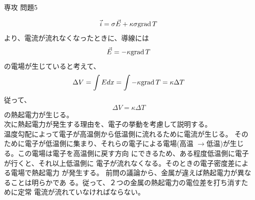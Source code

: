 \documentclass[fleqn]{jbook}
\begin{document}
\begin{answer}{専攻 問題5}{}
\begin{subanswers}
\SubAnswer
\begin{subsubanswers}

\SubSubAnswer
 
\[
\vec{i}=\sigma \vec{E}+\kappa\sigma {\rm grad\,}T
\]
より、電流が流れなくなったときに、導線には
\[
\vec{E}=-\kappa {\rm grad\,}T
\]
の電場が生じていると考えて、
\[
 \Delta V=\int Edx=\int -\kappa {\rm grad\,}T=\kappa\Delta T
\]
従って、
\[
 \Delta V=\kappa \Delta T
\]
 の熱起電力が生じる。\\
 次に熱起電力が発生する理由を、電子の挙動を考慮して説明する。\\
 温度勾配によって電子が高温側から低温側に流れるために電流が生じる。
 そのために電子が低温側に集まり、それらの電子による電場(高温
 $\rightarrow$低温)が生じる。この電場は電子を高温側に戻す方向
 にできるため、ある程度低温側に電子が行くと、それ以上低温側に
 電子が流れなくなる。そのときの電子密度差による電場で熱起電力
 が発生する。
\SubSubAnswer
 前問の議論から、金属が違えば熱起電力が異なることは明らかであ
 る。従って、２つの金属の熱起電力の電位差を打ち消すために定常
 電流が流れていなければならない。
\end{subsubanswers}
\SubAnswer

\begin{subsubanswers}
\SubSubAnswer


\end{subsubanswers}
\end{subanswers}
\end{answer}
\end{document}
